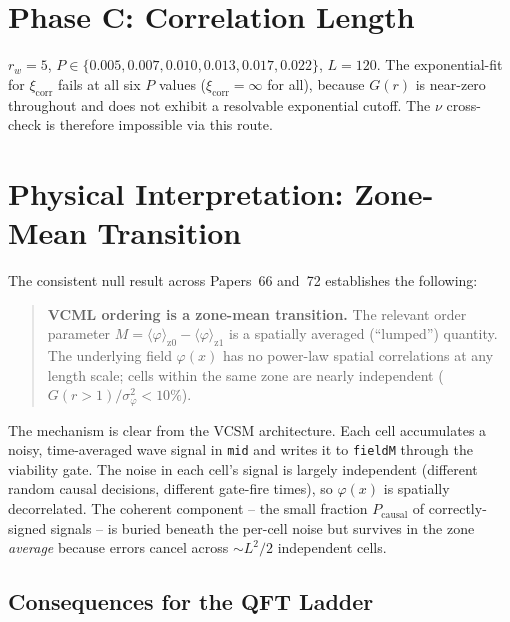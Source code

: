 \documentclass[11pt,a4paper]{article}
\begin{document}
\section{Phase C: Correlation Length}\label{sec:C}

$r_w{=}5$, $P\in\{0.005,0.007,0.010,0.013,0.017,0.022\}$, $L{=}120$.
The exponential-fit for $\xi_\text{corr}$ fails at all six $P$ values
($\xi_\text{corr}=\infty$ for all), because $G(r)$ is near-zero throughout
and does not exhibit a resolvable exponential cutoff.
The $\nu$ cross-check is therefore impossible via this route.

\section{Physical Interpretation: Zone-Mean Transition}\label{sec:physics}

The consistent null result across Papers~66 and~72 establishes the following:

\begin{quote}
\textbf{VCML ordering is a zone-mean transition.}  The relevant order parameter
$M = \langle\varphi\rangle_{\text{z}0} - \langle\varphi\rangle_{\text{z}1}$
is a spatially averaged (``lumped'') quantity.  The underlying field
$\varphi(x)$ has no power-law spatial correlations at any length scale;
cells within the same zone are nearly independent
($G(r{>}1)/\sigma^2_\varphi < 10\%$).
\end{quote}

The mechanism is clear from the VCSM architecture.  Each cell accumulates a
noisy, time-averaged wave signal in \texttt{mid} and writes it to \texttt{fieldM}
through the viability gate.  The noise in each cell's signal is largely
independent (different random causal decisions, different gate-fire times),
so $\varphi(x)$ is spatially decorrelated.  The coherent component -- the small
fraction $P_\text{causal}$ of correctly-signed signals -- is buried beneath the
per-cell noise but survives in the zone \emph{average} because errors cancel
across $\sim L^2/2$ independent cells.

\subsection{Consequences for the QFT Ladder}
\end{document}
